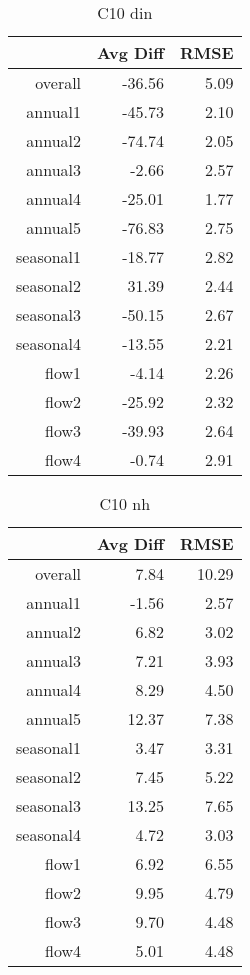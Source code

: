 \begin{table}[H]
\centering
\begin{tabular}{rrr}
  \hline
 & Avg Diff & RMSE \\ 
  \hline
overall & -36.56 & 5.09 \\ 
  annual1 & -45.73 & 2.10 \\ 
  annual2 & -74.74 & 2.05 \\ 
  annual3 & -2.66 & 2.57 \\ 
  annual4 & -25.01 & 1.77 \\ 
  annual5 & -76.83 & 2.75 \\ 
  seasonal1 & -18.77 & 2.82 \\ 
  seasonal2 & 31.39 & 2.44 \\ 
  seasonal3 & -50.15 & 2.67 \\ 
  seasonal4 & -13.55 & 2.21 \\ 
  flow1 & -4.14 & 2.26 \\ 
  flow2 & -25.92 & 2.32 \\ 
  flow3 & -39.93 & 2.64 \\ 
  flow4 & -0.74 & 2.91 \\ 
   \hline
\end{tabular}
\caption{C10 din} 
\end{table}
\begin{table}[H]
\centering
\begin{tabular}{rrr}
  \hline
 & Avg Diff & RMSE \\ 
  \hline
overall & 7.84 & 10.29 \\ 
  annual1 & -1.56 & 2.57 \\ 
  annual2 & 6.82 & 3.02 \\ 
  annual3 & 7.21 & 3.93 \\ 
  annual4 & 8.29 & 4.50 \\ 
  annual5 & 12.37 & 7.38 \\ 
  seasonal1 & 3.47 & 3.31 \\ 
  seasonal2 & 7.45 & 5.22 \\ 
  seasonal3 & 13.25 & 7.65 \\ 
  seasonal4 & 4.72 & 3.03 \\ 
  flow1 & 6.92 & 6.55 \\ 
  flow2 & 9.95 & 4.79 \\ 
  flow3 & 9.70 & 4.48 \\ 
  flow4 & 5.01 & 4.48 \\ 
   \hline
\end{tabular}
\caption{C10 nh} 
\end{table}
